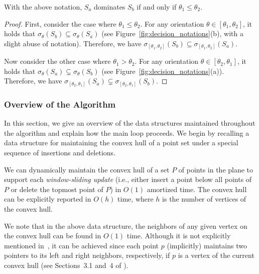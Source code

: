 \documentclass[english,a4paper, cleveref, autoref, thm-restate, nolineno]{socg-lipics-v2021}
\theoremstyle{star}
\theoremstyle{claimstar}
\begin{document}
\begin{observation}
    \label{obs:domination}
    With the above notation, $S_a$ dominates $S_b$ if and only if $\theta_1 \le \theta_2$. 
\end{observation}

\begin{proof}
    First, consider the case where $\theta_1 \le \theta_2$. 
    For any orientation $\theta \in [\theta_1, \theta_2]$, it holds that $\sigma_{\theta}(S_b) \subseteq \sigma_{\theta}(S_a)$ (see Figure~\ref{fig:decision_notations}(b), with a slight abuse of notation).
    Therefore, we have $\sigma_{[\theta_1, \theta_2]}(S_b) \subseteq \sigma_{[\theta_1, \theta_2]}(S_a)$.

    Now consider the other case where $\theta_1 > \theta_2$.
    For any orientation $\theta \in [\theta_2, \theta_1]$, it holds that $\sigma_{\theta}(S_a) \subsetneq \sigma_{\theta}(S_b)$ (see Figure~\ref{fig:decision_notations}(a)). 
    Therefore, we have $\sigma_{[\theta_2, \theta_1]}(S_a) \subsetneq \sigma_{[\theta_2, \theta_1]}(S_b)$.
\end{proof}



\subsubsection{Overview of the Algorithm}
\label{sec:decision_overview}

In this section, we give an overview of the data structures maintained throughout the algorithm and explain how the main loop proceeds. 
We begin by recalling a data structure for maintaining the convex hull of a point set under a special sequence of insertions and deletions.


\begin{lemma}
\label{lem:dyn_conv}
    We can dynamically maintain the convex hull of a set $P$ of points in the plane to support each \emph{window-sliding update} (i.e., either insert a point below all points of $P$ or delete the topmost point of $P$) in $O(1)$ amortized time. 
    The convex hull can be explicitly reported in $O(h)$ time, where $h$ is the number of vertices of the convex hull. 
\end{lemma}

We note that in the above data structure, the neighbors of any given vertex on the convex hull can be found in $O(1)$ time. 
Although it is not explicitly mentioned in~\cite{wang2023dynamic}, it can be achieved since each point $p$ (implicitly) maintains two pointers to its left and right neighbors, respectively, if $p$ is a vertex of the current convex hull (see Sections~3.1 and~4 of \cite{wang2023dynamic}).
\end{document}
